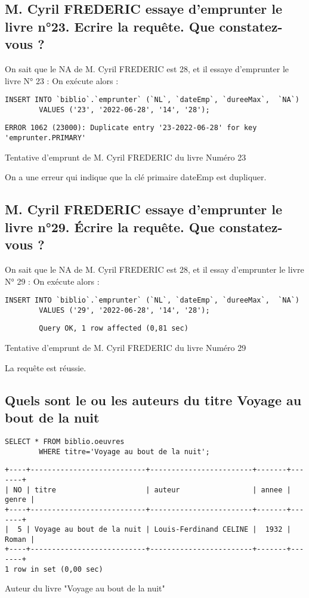 \documentclass{article}
\begin{document}
\subsection{M. Cyril FREDERIC essaye d’emprunter le livre n°23. Ecrire la requête. Que constatez-vous ?}
On sait que le NA de M. Cyril FREDERIC est 28, et il  essaye d'emprunter le livre N° 23 :
On exécute alors :
\begin{listing}[H]
	\begin{verbatim}
INSERT INTO `biblio`.`emprunter` (`NL`, `dateEmp`, `dureeMax`,  `NA`) 
		VALUES ('23', '2022-06-28', '14', '28');
\end{verbatim}
	\begin{verbatim}
ERROR 1062 (23000): Duplicate entry '23-2022-06-28' for key 'emprunter.PRIMARY'
\end{verbatim}
	\caption{Tentative d'emprunt de M. Cyril FREDERIC du livre Numéro 23}
\end{listing}
On a une erreur qui indique que la  clé primaire dateEmp est dupliquer.


\subsection{M. Cyril FREDERIC essaye d’emprunter le livre n°29. Écrire la requête. Que constatez-vous ?}
On sait que le NA de M. Cyril FREDERIC est 28, et il  essay d'emprunter le livre N° 29 :
On exécute alors :
\begin{listing}[H]
	\begin{verbatim}
INSERT INTO `biblio`.`emprunter` (`NL`, `dateEmp`, `dureeMax`,  `NA`) 
		VALUES ('29', '2022-06-28', '14', '28');
\end{verbatim}
	\begin{verbatim}
		Query OK, 1 row affected (0,81 sec)
\end{verbatim}
	\caption{Tentative d'emprunt de M. Cyril FREDERIC du livre Numéro 29}
\end{listing}
La requête est réussie.

\subsection{Quels sont le ou les auteurs du titre \og Voyage au bout de la nuit \fg}
\begin{listing}[H]
	\begin{verbatim}
SELECT * FROM biblio.oeuvres
		WHERE titre='Voyage au bout de la nuit';
\end{verbatim}
	\begin{verbatim}
+----+---------------------------+------------------------+-------+-------+
| NO | titre                     | auteur                 | annee | genre |
+----+---------------------------+------------------------+-------+-------+
|  5 | Voyage au bout de la nuit | Louis-Ferdinand CELINE |  1932 | Roman |
+----+---------------------------+------------------------+-------+-------+
1 row in set (0,00 sec)
\end{verbatim}
	\caption{Auteur du livre "Voyage au bout de la nuit"}
\end{listing}
\end{document}
